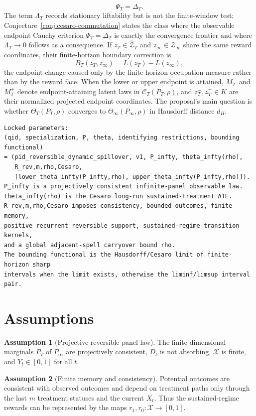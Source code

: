 \documentclass[11pt]{article}
\theoremstyle{definition}
\newtheorem{assumption}{Assumption}
\theoremstyle{plain}
\theoremstyle{remark}
\begin{document}
\[
\Psi_T=\Delta_T .
\]
The term \(\Lambda_T\) records stationary liftability but is not the finite-window test; Conjecture~\ref{conj:cesaro-commutation} states the class where the observable endpoint Cauchy criterion \(\Psi_T=\Delta_T\) is exactly the convergence frontier and where \(\Lambda_T\to0\) follows as a consequence.  If \(z_T\in\widehat{\mathcal Z}_T\) and \(z_\infty\in\mathcal Z_\infty\) share the same reward coordinates, their finite-horizon boundary correction is
\[
B_T(z_T,z_\infty)=L(z_T)-L(z_\infty),
\]
the endpoint change caused only by the finite-horizon occupation measure rather than by the reward face.  When the lower or upper endpoint is attained, \(M_T^{-}\) and \(M_T^{+}\) denote endpoint-attaining latent laws in \(\mathcal C_T(P_T,\rho)\), and \(z_T^{-},z_T^{+}\in K\) are their normalized projected endpoint coordinates.  The proposal's main question is whether \(\Theta_T(P_T,\rho)\) converges to \(\Theta_{\infty}(P_{\infty},\rho)\) in Hausdorff distance \(d_H\).

\begin{verbatim}
Locked parameters:
(qid, specialization, P, theta, identifying restrictions, bounding functional)
= (pid_reversible_dynamic_spillover, v1, P_infty, theta_infty(rho),
   R_rev,m,rho,Cesaro,
   [lower_theta_infty(P_infty,rho), upper_theta_infty(P_infty,rho)]).
P_infty is a projectively consistent infinite-panel observable law.
theta_infty(rho) is the Cesaro long-run sustained-treatment ATE.
R_rev,m,rho,Cesaro imposes consistency, bounded outcomes, finite memory,
positive recurrent reversible support, sustained-regime transition kernels,
and a global adjacent-spell carryover bound rho.
The bounding functional is the Hausdorff/Cesaro limit of finite-horizon sharp
intervals when the limit exists, otherwise the liminf/limsup interval pair.
\end{verbatim}

\section{Assumptions}
\begin{assumption}[Projective reversible panel law]\label{ass:projective}
The finite-dimensional marginals \(P_T\) of \(P_{\infty}\) are projectively consistent, \(D_t\) is not absorbing, \(\mathcal X\) is finite, and \(Y_t\in[0,1]\) for all \(t\).
\end{assumption}

\begin{assumption}[Finite memory and consistency]\label{ass:memory}
Potential outcomes are consistent with observed outcomes and depend on treatment paths only through the last \(m\) treatment statuses and the current \(X_t\).  Thus the sustained-regime rewards can be represented by the maps \(r_1,r_0:\mathcal X\to[0,1]\).
\end{assumption}
\end{document}
